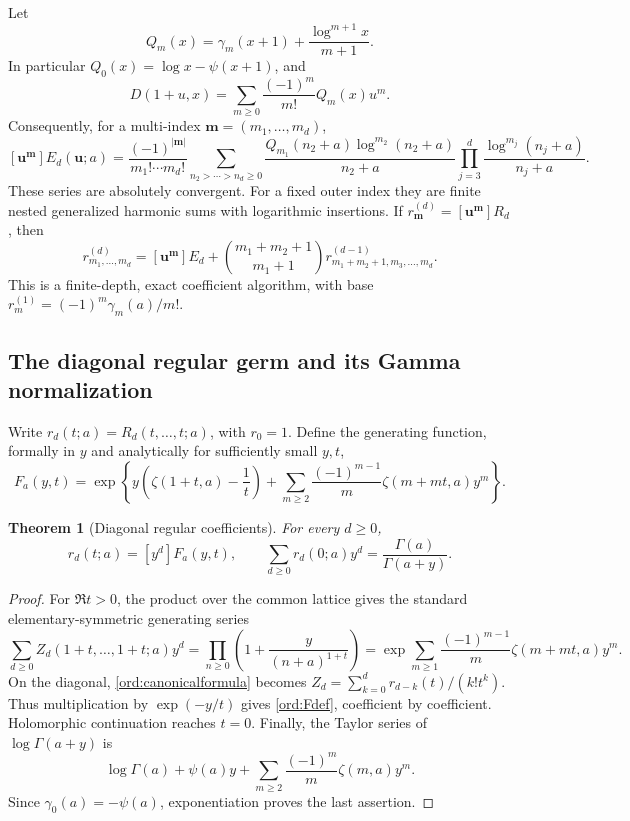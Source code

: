 \documentclass[11pt,letterpaper]{article}
\numberwithin{equation}{section}
\newtheorem{theorem}{Theorem}[section]
\theoremstyle{definition}
\theoremstyle{remark}
\begin{document}
Let
\[
 Q_m(x)=\gamma_m(x+1)+\frac{\log^{m+1}x}{m+1}.
\]
In particular $Q_0(x)=\log x-\psi(x+1)$, and
\[
 D(1+u,x)=\sum_{m\ge0}\frac{(-1)^m}{m!}Q_m(x)u^m.
\]
Consequently, for a multi-index $\mathbf m=(m_1,\ldots,m_d)$,
\begin{equation}\label{ord:Ecoeff}
 [\mathbf u^{\mathbf m}]E_d(\mathbf u;a)
 =\frac{(-1)^{|\mathbf m|}}{m_1!\cdots m_d!}
 \sum_{n_2>\cdots>n_d\ge0}
 \frac{Q_{m_1}(n_2+a)\log^{m_2}(n_2+a)}{n_2+a}
 \prod_{j=3}^d\frac{\log^{m_j}(n_j+a)}{n_j+a}.
\end{equation}
These series are absolutely convergent. For a fixed outer index they
are finite nested generalized harmonic sums with logarithmic insertions.
If $r^{(d)}_{\mathbf m}=[\mathbf u^{\mathbf m}]R_d$, then
\begin{equation}\label{ord:Rcoeffrec}
 r^{(d)}_{m_1,\ldots,m_d}
 =[\mathbf u^{\mathbf m}]E_d
 +\binom{m_1+m_2+1}{m_1+1}
 r^{(d-1)}_{m_1+m_2+1,m_3,\ldots,m_d}.
\end{equation}
This is a finite-depth, exact coefficient algorithm, with base
$r^{(1)}_m=(-1)^m\gamma_m(a)/m!$.

\subsection{The diagonal regular germ and its Gamma normalization}

Write $r_d(t;a)=R_d(t,\ldots,t;a)$, with $r_0=1$.
Define the generating function, formally in $y$ and analytically for
sufficiently small $y,t$,
\begin{equation}\label{ord:Fdef}
 F_a(y,t)=\exp\left\{
 y\left(\zeta(1+t,a)-\frac1t\right)
 +\sum_{m\ge2}\frac{(-1)^{m-1}}m
                   \zeta(m+mt,a)y^m\right\}.
\end{equation}

\begin{theorem}[Diagonal regular coefficients]
\label{ord:diag}
For every $d\ge0$,
\begin{equation}\label{ord:diagformula}
 r_d(t;a)=[y^d]F_a(y,t),\qquad
 \sum_{d\ge0}r_d(0;a)y^d=\frac{\Gamma(a)}{\Gamma(a+y)}.
\end{equation}
\end{theorem}

\begin{proof}
For $\Re t>0$, the product over the common lattice gives the standard
elementary-symmetric generating series
\[
 \sum_{d\ge0}Z_d(1+t,\ldots,1+t;a)y^d
 =\prod_{n\ge0}\left(1+\frac{y}{(n+a)^{1+t}}\right)
 =\exp\sum_{m\ge1}\frac{(-1)^{m-1}}m\zeta(m+mt,a)y^m.
\]
On the diagonal, \eqref{ord:canonicalformula} becomes
$Z_d=\sum_{k=0}^dr_{d-k}(t)/(k!t^k)$.
Thus multiplication by $\exp(-y/t)$ gives \eqref{ord:Fdef},
coefficient by coefficient. Holomorphic continuation reaches $t=0$.
Finally, the Taylor series of $\log\Gamma(a+y)$ is
\[
 \log\Gamma(a)+\psi(a)y
       +\sum_{m\ge2}\frac{(-1)^m}{m}\zeta(m,a)y^m.
\]
Since $\gamma_0(a)=-\psi(a)$, exponentiation proves the last assertion.
\end{proof}
\end{document}
